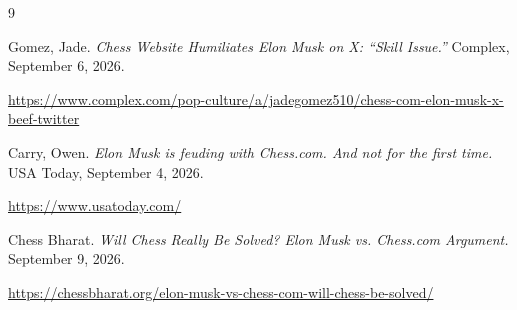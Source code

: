 \documentclass[12pt,a4paper]{article}
\begin{document}
\begin{thebibliography}{9}

Gomez, Jade.
\textit{Chess Website Humiliates Elon Musk on X: ``Skill Issue.''}
Complex, September 6, 2026.

\url{https://www.complex.com/pop-culture/a/jadegomez510/chess-com-elon-musk-x-beef-twitter}

Carry, Owen.
\textit{Elon Musk is feuding with Chess.com. And not for the first time.}
USA Today, September 4, 2026.

\url{https://www.usatoday.com/}

Chess Bharat.
\textit{Will Chess Really Be Solved? Elon Musk vs. Chess.com Argument.}
September 9, 2026.

\url{https://chessbharat.org/elon-musk-vs-chess-com-will-chess-be-solved/}

\end{thebibliography}
\end{document}
